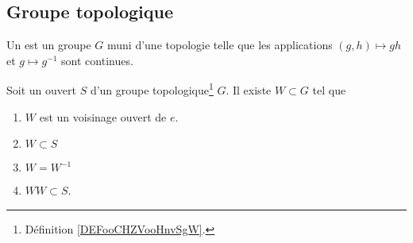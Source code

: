 

\subsection{Groupe topologique}


\begin{definition}      \label{DEFooCHZVooHnvSgW}
	Un  est un groupe \( G\) muni d'une topologie telle que les applications \( (g,h)\mapsto gh\) et \( g\mapsto g^{-1}\) sont continues.
\end{definition}

\begin{proposition}	\label{PROPooYNAXooWlUwfJ}
	Soit un ouvert \( S\) d'un groupe topologique\footnote{Définition \ref{DEFooCHZVooHnvSgW}.} \( G\). Il existe \( W\subset G\) tel que
	\begin{enumerate}
		\item
		      \( W\) est un voisinage ouvert de \( e\).
		\item
		      \( W\subset S\)
		\item
		      \( W=W^{-1}\)
		\item
		      \( WW\subset S\).
	\end{enumerate}
\end{proposition}

